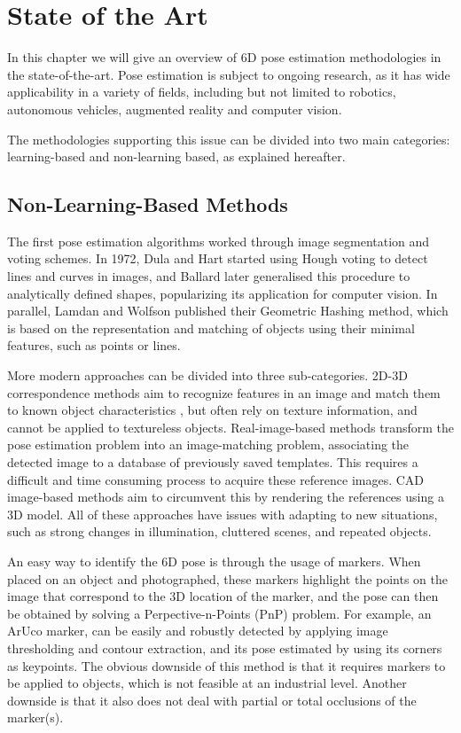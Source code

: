 \chapter{State of the Art}
\label{ch:state_of_the_art}

In this chapter we will give an overview of 6D pose estimation methodologies in the state-of-the-art. Pose estimation is subject to ongoing research, as it has wide applicability in a variety of fields, including but not limited to robotics, autonomous vehicles, augmented reality and computer vision.

The methodologies supporting this issue can be divided into two main categories: learning-based and non-learning based, as explained hereafter.

\section{Non-Learning-Based Methods}
\label{s:notlearningbasedmethods}

The first pose estimation algorithms worked through image segmentation and voting schemes. In 1972, Dula and Hart started using Hough\cite{Hough} voting to detect lines and curves in images\cite{HoughLines}, and Ballard later generalised this procedure to analytically defined shapes\cite{generalisedHough}, popularizing its application for computer vision. In parallel, Lamdan and Wolfson published their Geometric Hashing\cite{GHashing} method, which is based on the representation and matching of objects using their minimal features, such as points or lines.

More modern approaches can be divided into three sub-categories. 2D-3D correspondence methods aim to recognize features in an image and match them to known object characteristics \cite{SURF}, but often rely on texture information, and cannot be applied to textureless objects. Real-image-based methods\cite{ImageMatching} transform the pose estimation problem into an image-matching problem, associating the detected image to a database of previously saved templates. This requires a difficult and time consuming process to acquire these reference images. CAD image-based methods\cite{CADMatching} aim to circumvent this by rendering the references using a 3D model. All of these approaches have issues with adapting to new situations, such as strong changes in illumination, cluttered scenes, and repeated objects.

An easy way to identify the 6D pose is through the usage of markers. When placed on an object and photographed, these markers highlight the points on the image that correspond to the 3D location of the marker, and the pose can then be obtained by solving a Perpective-n-Points\cite{PnP} (PnP) problem. For example, an ArUco marker\cite{Aruco}, can be easily and robustly detected by applying image thresholding and contour extraction, and its pose estimated by using its corners as keypoints\cite{ArucoDetection}. The obvious downside of this method is that it requires markers to be applied to objects, which is not feasible at an industrial level. Another downside is that it also does not deal with partial or total occlusions of the marker(s).

